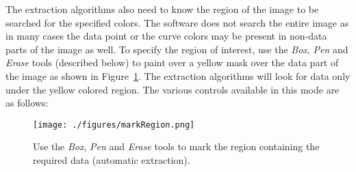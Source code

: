 \documentclass[letterpaper, 11pt]{article}
\begin{document}
The extraction algorithms also need to know the region of the image to be searched for the specified colors. The software does not search the entire image as in many cases the data point or the curve colors may be present in non-data parts of the image as well. To specify the region of interest, use the \emph{Box}, \emph{Pen} and \emph{Erase} tools (described below) to paint over a yellow mask over the data part of the image as shown in Figure~\ref{fig:markRegion}. The extraction algorithms will look for data only under the yellow colored region. The various controls available in this mode are as follows:

\begin{figure}
\begin{center}
\texttt{[image: ./figures/markRegion.png]}
\caption{Use the \emph{Box}, \emph{Pen} and \emph{Erase} tools to mark the region containing the required data (automatic extraction).}
\label{fig:markRegion}
\end{center}
\end{figure}
\end{document}
